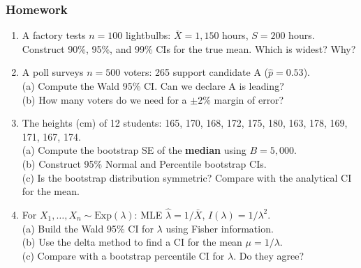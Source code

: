 \documentclass[aspectratio=169]{beamer}
\begin{document}
\begin{frame}
\frametitle{Homework}
\begin{enumerate}\setlength{\itemsep}{6pt}
  \item A factory tests $n = 100$ lightbulbs: $\bar{X} = 1{,}150$ hours, $S = 200$ hours.\\
    Construct 90\%, 95\%, and 99\% CIs for the true mean. Which is widest? Why?

  \item A poll surveys $n = 500$ voters: 265 support candidate A ($\hat{p} = 0.53$).\\
    (a) Compute the Wald 95\% CI. Can we declare A is leading?\\
    (b) How many voters do we need for a $\pm 2\%$ margin of error?

  \item The heights (cm) of 12 students: 165, 170, 168, 172, 175, 180, 163, 178, 169, 171, 167, 174.\\
    (a) Compute the bootstrap SE of the \textbf{median} using $B = 5{,}000$.\\
    (b) Construct 95\% Normal and Percentile bootstrap CIs.\\
    (c) Is the bootstrap distribution symmetric? Compare with the analytical CI for the mean.

  \item For $X_1, \ldots, X_n \sim \text{Exp}(\lambda)$: MLE $\hat\lambda = 1/\bar{X}$, $I(\lambda) = 1/\lambda^2$.\\
    (a) Build the Wald 95\% CI for $\lambda$ using Fisher information.\\
    (b) Use the delta method to find a CI for the mean $\mu = 1/\lambda$.\\
    (c) Compare with a bootstrap percentile CI for $\lambda$. Do they agree?
\end{enumerate}
\end{frame}
\end{document}
